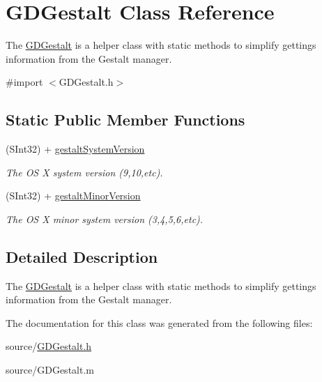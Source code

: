 \hypertarget{interface_g_d_gestalt}{
\section{GDGestalt Class Reference}
\label{interface_g_d_gestalt}
}


The \hyperlink{interface_g_d_gestalt}{GDGestalt} is a helper class with static methods to simplify gettings information from the Gestalt manager.  


{\ttfamily \#import $<$GDGestalt.h$>$}\subsection*{Static Public Member Functions}
\begin{DoxyCompactItemize}
\item 
\hypertarget{interface_g_d_gestalt_ada41ffae6913b622524636f4932a27bb}{
(SInt32) + \hyperlink{interface_g_d_gestalt_ada41ffae6913b622524636f4932a27bb}{gestaltSystemVersion}}
\label{interface_g_d_gestalt_ada41ffae6913b622524636f4932a27bb}

\begin{DoxyCompactList}\small\item\em The OS X system version (9,10,etc). \item\end{DoxyCompactList}\item 
\hypertarget{interface_g_d_gestalt_acbfa38f229fb9a2e22c0bcad684864f1}{
(SInt32) + \hyperlink{interface_g_d_gestalt_acbfa38f229fb9a2e22c0bcad684864f1}{gestaltMinorVersion}}
\label{interface_g_d_gestalt_acbfa38f229fb9a2e22c0bcad684864f1}

\begin{DoxyCompactList}\small\item\em The OS X minor system version (3,4,5,6,etc). \item\end{DoxyCompactList}\end{DoxyCompactItemize}


\subsection{Detailed Description}
The \hyperlink{interface_g_d_gestalt}{GDGestalt} is a helper class with static methods to simplify gettings information from the Gestalt manager. 

The documentation for this class was generated from the following files:\begin{DoxyCompactItemize}
\item 
source/\hyperlink{_g_d_gestalt_8h}{GDGestalt.h}\item 
source/GDGestalt.m\end{DoxyCompactItemize}
